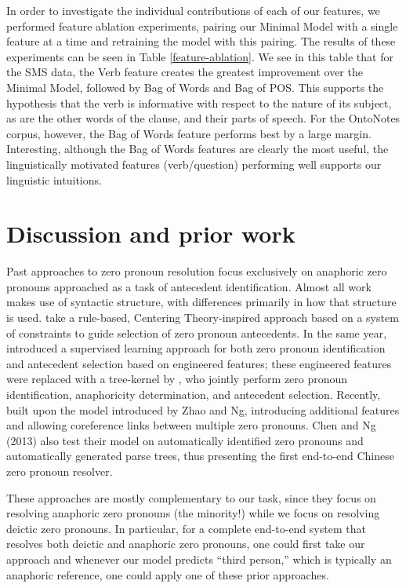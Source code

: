 \documentclass[11pt]{report}
\begin{document}
In order to investigate the individual contributions of each of our features, we performed feature ablation experiments, pairing our Minimal Model with a single feature at a time and retraining the model with this pairing. The results of these experiments can be seen in Table \ref{feature-ablation}.
We see in this table that for the SMS data, the Verb feature creates the greatest improvement over the Minimal Model, followed by Bag of Words and Bag of POS. This supports the hypothesis that the verb is informative with respect to the nature of its subject, as are the other words of the clause, and their parts of speech. For the OntoNotes corpus, however, the Bag of Words feature performs best by a large margin. Interesting, although the Bag of Words features are clearly the most useful, the linguistically motivated features (verb/question) performing well supports our linguistic intuitions.

\section{Discussion and prior work}\label{related-work}

Past approaches to zero pronoun resolution focus exclusively on anaphoric zero pronouns approached as a task of antecedent identification. Almost all work makes use of syntactic structure, with differences primarily in how that structure is used. \cite{yeh2007zero} take a rule-based, Centering Theory-inspired approach based on a system of constraints to guide selection of zero pronoun antecedents. In the same year, \cite{zhao2007identification} introduced a supervised learning approach for both zero pronoun identification and antecedent selection based on engineered features; these engineered features were replaced with a tree-kernel by \cite{kong2010tree}, who jointly perform zero pronoun identification, anaphoricity determination, and antecedent selection. Recently, \cite{chen2013chinese} built upon the model introduced by Zhao and Ng, introducing additional features and allowing coreference links between multiple zero pronouns. Chen and Ng (2013) also test their model on automatically identified zero pronouns and automatically generated parse trees, thus presenting the first end-to-end Chinese zero pronoun resolver. 

These approaches are mostly complementary to our task, since they focus on resolving anaphoric zero pronouns (the minority!) while we focus on resolving deictic zero pronouns. In particular, for a complete end-to-end system that resolves both deictic and anaphoric zero pronouns, one could first take our approach and whenever our model predicts ``third person,'' which is typically an anaphoric reference, one could apply one of these prior approaches.
\end{document}
